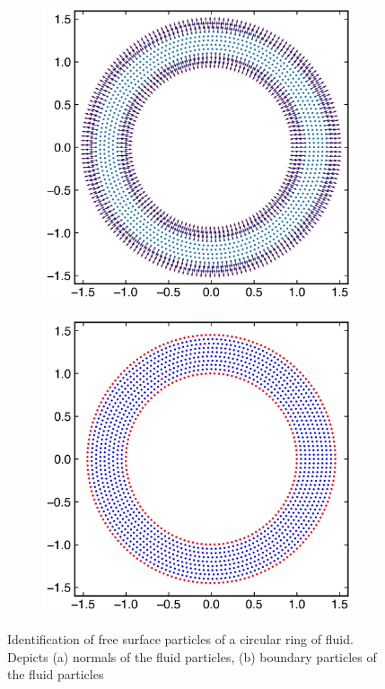 \documentclass[preprint,12pt]{elsarticle}
\begin{document}
\begin{figure}[!htpb]
  \centering
  \begin{subfigure}{0.48\textwidth}
    \centering
    \includegraphics[width=1\linewidth]{figures/free_surface_identification_demonstration/circle_geometry_normals}
    \subcaption{}%
    \label{fig:free_surface_circle_normals}
  \end{subfigure}
  \begin{subfigure}{0.48\textwidth}
    \centering
    \includegraphics[width=1\linewidth]{figures/free_surface_identification_demonstration/circle_geometry}
    \subcaption{}%
    \label{fig:free_surface_circle_boundary_particles}
  \end{subfigure}
  \caption{Identification of free surface particles of a circular ring of
    fluid. Depicts (a) normals of the fluid particles, (b) boundary particles
    of the fluid particles}
\label{fig:boundary-particles-circle}
\end{figure}
\end{document}
